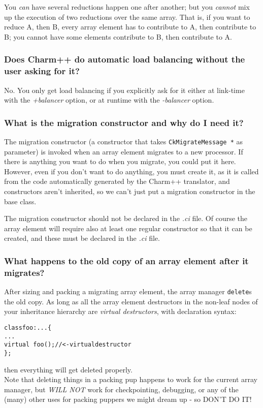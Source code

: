 You {\em can} have several reductions happen one after another; but
you {\em cannot} mix up the execution of two reductions over the same
array. That is, if you want to reduce A, then B, every array element has
to contribute to A, then contribute to B; you cannot have some elements
contribute to B, then contribute to A.

\subsubsection{Does Charm++ do automatic load balancing without the user asking
for it?}

No. You only get load balancing if you explicitly ask for it either at link-time
with the {\em +balancer} option, or at runtime with the {\em -balancer} option.

\subsubsection{What is the migration constructor and why do I need it?}

The migration constructor (a constructor that takes {\tt CkMigrateMessage *}
as parameter) is invoked when an array element migrates to a new
processor. If there is anything you want to do when you migrate, you could put
it here. However, even if you don't want to do anything, you must create it, as
it is called from the code automatically generated by the Charm++ translator,
and constructors aren't inherited, so we can't just put a migration constructor
in the base class.

The migration constructor should not be declared in the {\em .ci} file. Of
course the array element will require also at least one regular constructor so
that it can be created, and these must be declared in the {\em .ci} file.

\subsubsection{What happens to the old copy of an array element after it migrates?}

After sizing and packing a migrating array element, the array manager
{\tt delete}s
the old copy. As long as all the array element destructors in the non-leaf
nodes of your inheritance hierarchy are {\em virtual destructors}, with
declaration syntax:
\begin{alltt}
class foo : ... \{
  ...
  virtual ~foo(); // <- virtual destructor
\};
\end{alltt}
then everything will get deleted properly.\\
Note that deleting things in a packing pup happens to work for the
current array manager, but {\em WILL NOT} work for checkpointing, debugging,
or any of the (many) other uses for packing puppers we might dream up -
so DON'T DO IT!

